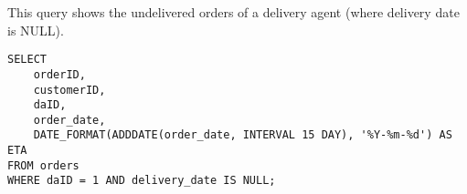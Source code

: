 This query shows the undelivered orders of a delivery agent (where delivery date is NULL).

\begin{lstlisting}
SELECT
    orderID,
    customerID,
    daID,
    order_date,
    DATE_FORMAT(ADDDATE(order_date, INTERVAL 15 DAY), '%Y-%m-%d') AS ETA
FROM orders
WHERE daID = 1 AND delivery_date IS NULL;
\end{lstlisting}